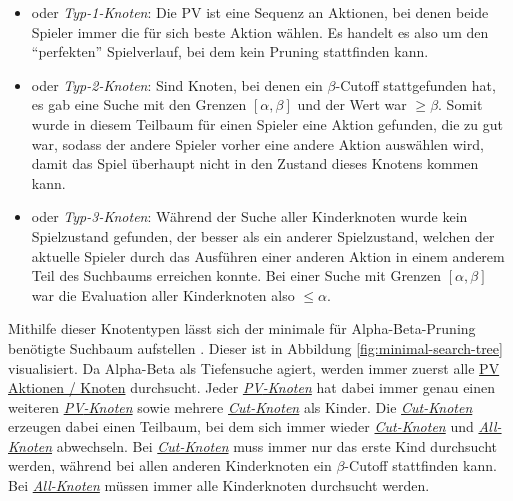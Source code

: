 \vspace*{-5cm}

\pagebreak

\begin{itemize}
    \item {} oder \emph{Typ-1-Knoten}: Die \ac{PV} ist eine Sequenz an Aktionen, bei denen beide Spieler immer die für sich beste Aktion wählen. Es handelt es also um den \enquote{perfekten} Spielverlauf, bei dem kein Pruning stattfinden kann. \cite[S. 316f.]{2005.EnhancedForwardPruning}
    \item \vspace*{-0.125cm}  oder \emph{Typ-2-Knoten}: Sind Knoten, bei denen ein $\beta$-Cutoff stattgefunden hat, \dash es gab eine Suche mit den Grenzen $\left[\alpha, \beta\right]$ und der Wert war $\ge \beta$. Somit wurde in diesem Teilbaum für einen Spieler eine Aktion gefunden, die zu gut war, sodass der andere Spieler vorher eine andere Aktion auswählen wird, damit das Spiel überhaupt nicht in den Zustand dieses Knotens kommen kann. \cite[S. 324]{1975.AlphaBeta}
    \item \vspace*{-0.125cm}  oder \emph{Typ-3-Knoten}: Während der Suche aller Kinderknoten wurde kein Spielzustand gefunden, der besser als ein anderer Spielzustand, welchen der aktuelle Spieler durch das Ausführen einer anderen Aktion in einem anderem Teil des Suchbaums erreichen konnte. Bei einer Suche mit Grenzen $\left[\alpha, \beta\right]$ war die Evaluation aller Kinderknoten also $\le \alpha$. \cite[S. 446]{1985.ParallelAlphaBeta}
\end{itemize}

\vspace*{-0.13cm}

Mithilfe dieser Knotentypen lässt sich der minimale für Alpha-Beta-Pruning benötigte Suchbaum aufstellen \cite[S. 8]{1991.SingleAgentGameTreeSearch}. Dieser ist in Abbildung \ref{fig:minimal-search-tree} visualisiert. Da Alpha-Beta als Tiefensuche agiert, werden immer zuerst alle \hyperref[text:pv-node]{\acs{PV} Aktionen / Knoten} durchsucht. Jeder \hyperref[text:pv-node]{\emph{\acs{PV}-Knoten}} hat dabei immer genau einen weiteren \hyperref[text:pv-node]{\emph{\acs{PV}-Knoten}} sowie mehrere \hyperref[text:cut-node]{\emph{Cut-Knoten}} als Kinder. Die \hyperref[text:cut-node]{\emph{Cut-Knoten}} erzeugen dabei einen Teilbaum, bei dem sich immer wieder \hyperref[text:cut-node]{\emph{Cut-Knoten}} und \hyperref[text:all-node]{\emph{All-Knoten}} abwechseln. Bei \hyperref[text:cut-node]{\emph{Cut-Knoten}} muss immer nur das erste Kind durchsucht werden, während bei allen anderen Kinderknoten ein $\beta$-Cutoff stattfinden kann. Bei \hyperref[text:all-node]{\emph{All-Knoten}} müssen immer alle Kinderknoten durchsucht werden.


